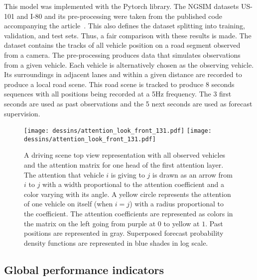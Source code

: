 \documentclass[a4paper, 10pt, conference]{ieeeconf}      %
\begin{document}
This model was implemented with the Pytorch library.
The NGSIM datasets US-101 and I-80 and its pre-processing were taken from
the published code accompanying the article~\cite{Deo2018}.
This also defines the dataset splitting into training, validation, and test sets.
Thus, a fair comparison with these results is made.
The dataset contains the tracks of all vehicle position on a road segment observed from a camera.
The pre-processing produces data that simulates observations from a given vehicle.
Each vehicle is alternatively chosen as the observing vehicle.
Its surroundings in adjacent lanes and within a given distance are recorded to produce a local road scene.
This road scene is tracked to produce 8 seconds sequences with all positions being recorded at a 5Hz frequency.
The 3 first seconds are used as past observations and the 5 next seconds are used as forecast supervision.



\begin{figure*}
        \centering
        \texttt{[image: dessins/attention\_look\_front\_131.pdf]}
        \texttt{[image: dessins/attention\_look\_front\_131.pdf]}
        \vspace{-10pt}
        \caption{
        A driving scene top view representation with all observed vehicles and the
        attention matrix for one head of the first attention layer.
        The attention that vehicle $i$ is giving to $j$ is drawn as an arrow from $i$ to $j$ with a width proportional
        to the attention coefficient and a color varying with its angle.
        A yellow circle represents the attention of one vehicle on itself (when $i=j$) with a radius proportional to
        the coefficient.
        The attention coefficients are represented as colors in the matrix on the left going from purple at $0$ to
        yellow at $1$.
        Past positions are represented in gray.
        Superposed forecast probability density functions are represented in blue shades in log scale.}
        \label{fig_veh_att}
        \vspace{-10pt}
\end{figure*}


\subsection{Global performance indicators}
\end{document}
